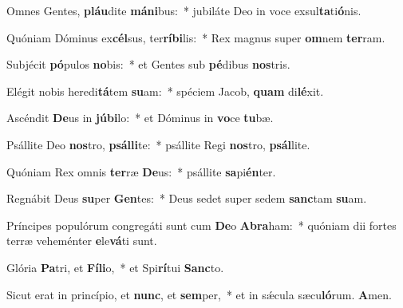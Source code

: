 \item Omnes Gentes, \textbf{pláu}dite \textbf{má}\textbf{ni}bus:~* jubiláte Deo in voce exsul\textbf{ta}ti\textbf{ó}nis.
\item Quóniam Dóminus ex\textbf{cél}sus, ter\textbf{rí}\textbf{bi}lis:~* Rex magnus super \textbf{om}nem \textbf{ter}ram.
\item Subjécit \textbf{pó}pulos \textbf{no}bis:~* et Gentes sub \textbf{pé}dibus \textbf{nos}tris.
\item Elégit nobis heredi\textbf{tá}tem \textbf{su}am:~* spéciem Jacob, \textbf{quam} di\textbf{lé}xit.
\item Ascéndit \textbf{De}us in \textbf{jú}\textbf{bi}lo:~* et Dóminus in \textbf{vo}ce \textbf{tu}bæ.
\item Psállite Deo \textbf{nos}tro, \textbf{psál}\textbf{li}te:~* psállite Regi \textbf{nos}tro, \textbf{psál}lite.
\item Quóniam Rex omnis \textbf{ter}ræ \textbf{De}us:~* psállite \textbf{sa}pi\textbf{én}ter.
\item Regnábit Deus \textbf{su}per \textbf{Gen}tes:~* Deus sedet super sedem \textbf{sanc}tam \textbf{su}am.
\item Príncipes populórum congre\-gáti sunt cum \textbf{De}o \textbf{A}\textbf{bra}ham:~* quóniam dii fortes terræ veheménter \textbf{e}le\textbf{vá}ti sunt.
\item Glória \textbf{Pa}tri, et \textbf{Fí}\textbf{li}o,~* et Spi\textbf{rí}tui \textbf{Sanc}to.
\item Sicut erat in princípio, et \textbf{nunc}, et \textbf{sem}per,~* et in sǽcula sæcu\textbf{ló}rum. \textbf{A}men.
